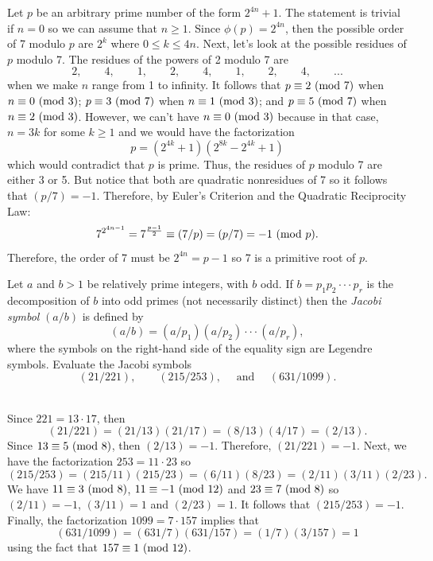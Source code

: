 \begin{solution}
    Let $p$ be an arbitrary prime number of the form $2^{4n} + 1$. The statement is trivial if $n = 0$ so we can assume that $n \geq 1$. Since $\phi(p) = 2^{4n}$, then the possible order of 7 modulo $p$ are $2^k$ where $0 \leq k \leq 4n$. Next, let's look at the possible residues of $p$ modulo 7. The residues of the powers of 2 modulo 7 are 
    $$2, \qquad 4, \qquad 1, \qquad 2, \qquad 4, \qquad 1, \qquad 2, \qquad 4, \qquad ...$$
    when we make $n$ range from 1 to infinity. It follows that $p \equiv 2 \ (\mathrm{mod}\ 7)$ when $n \equiv 0 \ (\mathrm{mod}\ 3)$; $p \equiv 3 \ (\mathrm{mod}\ 7)$ when $n \equiv 1 \ (\mathrm{mod}\ 3)$; and $p \equiv 5 \ (\mathrm{mod}\ 7)$ when $n \equiv 2 \ (\mathrm{mod}\ 3)$. However, we can't have $n \equiv 0 \ (\mathrm{mod}\ 3)$ because in that case, $n = 3k$ for some $k \geq 1$ and we would have the factorization
    $$p = (2^{4k} + 1)(2^{8k} - 2^{4k} + 1)$$
    which would contradict that $p$ is prime. Thus, the residues of $p$ modulo 7 are either 3 or 5. But notice that both are quadratic nonresidues of 7 so it follows that $(p/7) = -1$. Therefore, by Euler's Criterion and the Quadratic Reciprocity Law:
    $$7^{2^{4n - 1}} = 7^{\frac{p-1}{2}} \equiv (7/p) = (p/7) = -1 \ (\mathrm{mod}\ p).$$
    Therefore, the order of 7 must be $2^{4n} = p-1$ so 7 is a primitive root of $p$. \\
\end{solution}

\begin{exercise}
    Let $a$ and $b > 1$ be relatively prime integers, with $b$ odd. If $b = p_1p_2 \cdot \cdot \cdot p_r$ is the decomposition of $b$ into odd primes (not necessarily distinct) then the \textit{Jacobi symbol} $(a/b)$ is defined by
    $$(a/b) = (a/p_1)(a/p_2) \cdot \cdot \cdot (a/p_r),$$
    where the symbols on the right-hand side of the equality sign are Legendre symbols. Evaluate the Jacobi symbols
    $$(21/221), \qquad (215/253), \quad \text{ and } \quad (631/1099).$$\\
\end{exercise}

\begin{solution}
    Since $221 = 13\cdot 17$, then
    $$(21/221) = (21/13)(21/17) = (8/13)(4/17) = (2/13).$$
    Since $13 \equiv 5 \ (\mathrm{mod}\ 8)$, then $(2/13) = -1$. Therefore, $(21/221) = -1$. Next, we have the factorization $253 = 11\cdot 23$ so
    $$(215/253) = (215/11)(215/23) = (6/11)(8/23) = (2/11)(3/11)(2/23).$$
    We have $11 \equiv 3 \ (\mathrm{mod}\ 8)$, $11 \equiv -1 \ (\mathrm{mod}\ 12)$ and $23 \equiv 7 \ (\mathrm{mod}\ 8)$ so $(2/11) = -1$, $(3/11) = 1$ and $(2/23) = 1$. It follows that $(215/253) = -1$. Finally, the factorization $1099 = 7\cdot 157$ implies that
    $$(631/1099) = (631/7)(631/157) = (1/7)(3/157) = 1$$
    using the fact that $157 \equiv 1 \ (\mathrm{mod}\ 12)$.\\
\end{solution}


